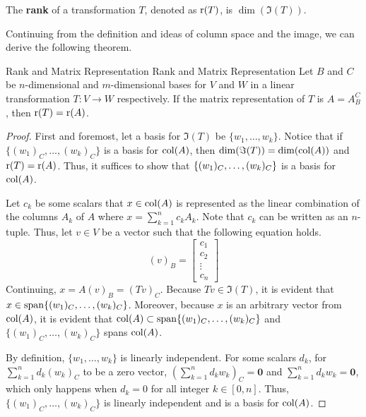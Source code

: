 \documentclass[../main.tex]{subfiles}
\begin{document}
\begin{definition}
The \textbf{rank} of a transformation $T$, denoted as $\operatorname{r}(T)$,
is $\dim(\Im(T))$.
\end{definition}

Continuing from the definition and ideas of column space and the
image, we can derive the following theorem.

\begin{theorem}{Rank and Matrix Representation}
{Rank and Matrix Representation}
Let $B$ and $C$ be $n$-dimensional and $m$-dimensional bases for
$V$ and $W$ in a linear transformation $T: V \to W$ respectively.
If the matrix representation of $T$ is $A = A_B^C$, then
$\operatorname{r}(T) = \operatorname{r}(A)$.
\end{theorem}
\begin{proof}
First and foremost, let a basis for $\Im(T)$ be $\{ w_1, \ldots,
w_k \}$. Notice that if $\{ (w_1)_C, \ldots, (w_k)_C \}$ is a
basis for $\operatorname{col}(A)$, then $\dim(\Im(T)) = \dim(\operatorname{col}(A))$ and
$\operatorname{r}(T) = \operatorname{r}(A)$. Thus, it suffices to show that $\{ (w_1)_C,
\linebreak \ldots, (w_k)_C \}$ is a basis for $\operatorname{col}(A)$.

Let $c_k$ be some scalars that $x \in \operatorname{col}(A)$ is represented
as the linear combination of the columns $A_k$ of $A$ where
$x = \sum_{k=1}^n c_k A_k$. Note that $c_k$ can be written as
an $n$-tuple. Thus, let $v \in V$ be a vector such that the
following equation holds.
\[
(v)_B =
\begin{bmatrix}
    c_1 \\
    c_2 \\
    \vdots \\
    c_n
\end{bmatrix}
\]
Continuing, $x = A(v)_B = (Tv)_C$. Because $Tv \in \Im(T)$,
it is evident that $x \in \operatorname{span}\{ (w_1)_C, \ldots, (w_k)_C \}$.
Moreover, because $x$ is an arbitrary vector from $\operatorname{col}(A)$,
it is evident that $\Col(A) \subset \Span\{ (w_1)_C, \ldots,
\linebreak (w_k)_C \}$ and $\{ (w_1)_C, \ldots, (w_k)_C \}$ spans
$\operatorname{col}(A)$.

By definition, $\{ w_1, \ldots, w_k \}$ is linearly independent.
For some scalars $d_k$, for $\sum_{k=1}^n d_k (w_k)_C$ to be
a zero vector, $(\sum_{k=1}^n d_k w_k)_C = \mathbf{0}$ and
$\sum_{k=1}^n d_k w_k = \mathbf{0}$, which only happens when
$d_k = 0$ for all integer $k \in [0, n]$. Thus, $\{ (w_1)_C,
\ldots, (w_k)_C \}$ is linearly independent and is a basis for
$\operatorname{col}(A)$.
\end{proof}
\end{document}
